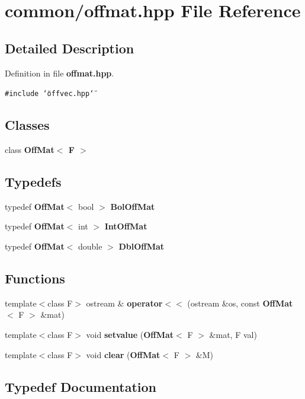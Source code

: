\section{common/offmat.hpp File Reference}
\label{offmat_8hpp}


\subsection{Detailed Description}


Definition in file {\bf offmat.hpp}.

{\tt \#include \char`\"{}offvec.hpp\char`\"{}}\par
\subsection*{Classes}
\begin{CompactItemize}
\item 
class {\bf Off\-Mat$<$ F $>$}
\end{CompactItemize}
\subsection*{Typedefs}
\begin{CompactItemize}
\item 
typedef {\bf Off\-Mat}$<$ bool $>$ {\bf Bol\-Off\-Mat}
\item 
typedef {\bf Off\-Mat}$<$ int $>$ {\bf Int\-Off\-Mat}
\item 
typedef {\bf Off\-Mat}$<$ double $>$ {\bf Dbl\-Off\-Mat}
\end{CompactItemize}
\subsection*{Functions}
\begin{CompactItemize}
\item 
template$<$class F$>$ ostream \& {\bf operator$<$$<$} (ostream \&os, const {\bf Off\-Mat}$<$ F $>$ \&mat)
\item 
template$<$class F$>$ void {\bf setvalue} ({\bf Off\-Mat}$<$ F $>$ \&mat, F val)
\item 
template$<$class F$>$ void {\bf clear} ({\bf Off\-Mat}$<$ F $>$ \&M)
\end{CompactItemize}


\subsection{Typedef Documentation}
